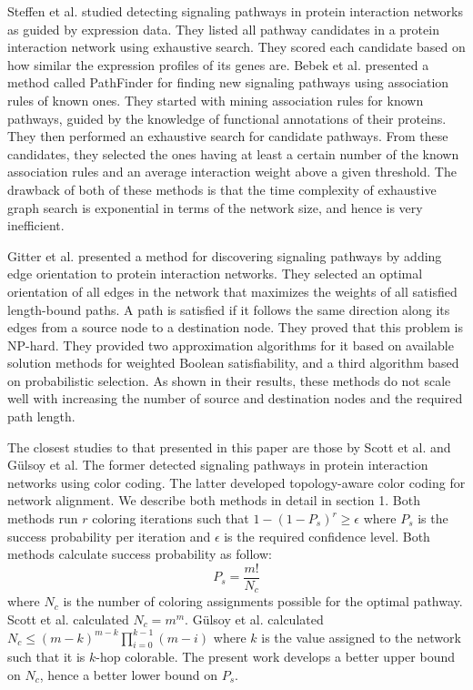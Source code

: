 \documentclass{ws-procs11x85}
\begin{document}
Steffen et al.\cite{steffen} studied detecting signaling pathways in protein
interaction networks as guided by expression data. They listed all pathway
candidates in a protein interaction network using exhaustive search. They
scored each candidate based on how similar the expression profiles of its
genes are. Bebek et al.\cite{bebek} presented a method called PathFinder for
finding new signaling pathways using association rules of known ones. They
started with mining association rules for known pathways, guided by the
knowledge of functional annotations of their proteins. They then performed an
exhaustive search for candidate pathways. From these candidates, they selected
the ones having at least a certain number of the known association rules and an
average interaction weight above a given threshold. The drawback of both of
these methods is that the time complexity of exhaustive graph search is
exponential in terms of the network size, and hence is very inefficient.

Gitter et al.\cite{gitter} presented a method for discovering signaling
pathways by adding edge orientation to protein interaction networks. They
selected an optimal orientation of all edges in the network that maximizes the
weights of all satisfied length-bound paths. A path is satisfied if it follows
the same direction along its edges from a source node to a destination node.
They proved that this problem is NP-hard. They provided two approximation
algorithms for it based on available solution methods for weighted Boolean
satisfiability, and a third algorithm based on probabilistic selection. As
shown in their results, these methods do not scale well with increasing the
number of source and destination nodes and the required path length.

The closest studies to that presented in this paper are those by Scott et
al.\cite{scott} and G{\"u}lsoy et al\cite{gulsoy}. The former detected signaling
pathways in protein interaction networks using color coding. The latter
developed topology-aware color coding for network alignment. We describe both
methods in detail in section 1. Both methods run $r$ coloring iterations such
that $1 - (1 - P_s)^r \geq \epsilon$ where $P_s$ is the success probability per
iteration and $\epsilon$ is the required confidence level. Both methods
calculate success probability as follow:
\begin{equation}
P_s = \frac{m!}{N_c}
\end{equation}
where $N_c$ is the number of coloring assignments possible for the optimal
pathway. Scott et al.\cite{scott} calculated $N_c = m^m$. G{\"u}lsoy et
al.\cite{gulsoy} calculated $N_c \leq (m - k)^{m - k} \prod_{i=0}^{k-1} (m -
i)$ where $k$ is the value assigned to the network such that it is $k$-hop
colorable. The present work develops a better upper bound on $N_c$, hence a
better lower bound on $P_s$.
\end{document}
